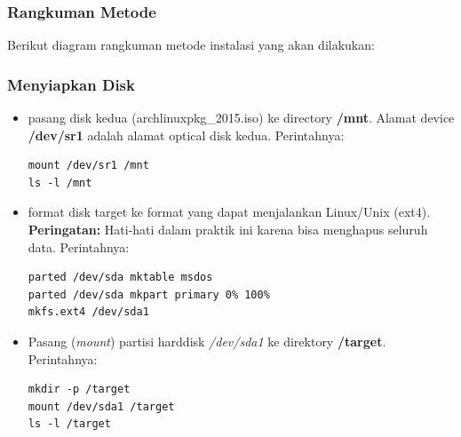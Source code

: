 \documentclass[12pt,]{article}
\begin{document}
	\subsubsection{Rangkuman Metode}
	Berikut diagram rangkuman metode instalasi yang akan dilakukan:
	
	\subsubsection{Menyiapkan Disk}
	\begin{itemize}
		\item pasang disk kedua (archlinuxpkg\_2015.iso) ke directory \textbf{/mnt}.
		Alamat device \textbf{/dev/sr1} adalah alamat optical disk kedua.
		Perintahnya:
		\begin{verbatim}
mount /dev/sr1 /mnt
ls -l /mnt
		\end{verbatim}
		
		\item format disk target ke format yang dapat menjalankan Linux/Unix (ext4).
		\textbf{Peringatan:} Hati-hati dalam praktik ini karena bisa menghapus seluruh data.
		Perintahnya:
		\begin{verbatim}
parted /dev/sda mktable msdos
parted /dev/sda mkpart primary 0% 100%
mkfs.ext4 /dev/sda1
		\end{verbatim}
		
		\item Pasang (\textit{mount}) partisi harddisk \textit{/dev/sda1} ke direktory \textbf{/target}.
		Perintahnya:
		\begin{verbatim}
mkdir -p /target
mount /dev/sda1 /target
ls -l /target
		\end{verbatim}
	\end{itemize}	
\end{document}
